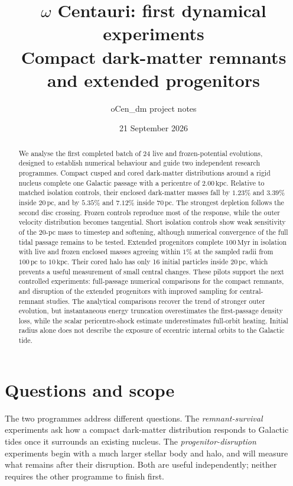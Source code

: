 \documentclass[11pt,a4paper]{article}
\title{\vspace{-1.0cm}$\omega$ Centauri: first dynamical experiments\\[3pt]
\large Compact dark-matter remnants and extended progenitors}
\author{oCen\_dm project notes}
\date{21 September 2026}
\newcommand{\pc}{\,\mathrm{pc}}
\newcommand{\kpc}{\,\mathrm{kpc}}
\newcommand{\Myr}{\,\mathrm{Myr}}
\begin{document}
\maketitle
\begin{abstract}
We analyse the first completed batch of 24 live and frozen-potential evolutions,
designed to establish numerical behaviour and guide two independent research
programmes. Compact cusped and cored dark-matter distributions around a rigid
nucleus complete one Galactic passage with a pericentre of $2.00\kpc$.
Relative to matched isolation controls, their enclosed dark-matter masses fall
by $1.23\%$ and $3.39\%$ inside $20\pc$, and by $5.35\%$ and $7.12\%$ inside
$70\pc$. The strongest depletion follows the second disc crossing. Frozen
controls reproduce most of the response, while the outer velocity distribution
becomes tangential. Short isolation controls show weak sensitivity of the
$20$-pc mass to timestep and softening, although numerical convergence of the
full tidal passage remains to be tested. Extended progenitors complete
$100\Myr$ in isolation with live and frozen enclosed masses agreeing within
$1\%$ at the sampled radii from $100\pc$ to $10\kpc$. Their cored halo has only
16 initial particles inside $20\pc$, which prevents a useful measurement of
small central changes. These pilots support the next controlled experiments:
full-passage numerical comparisons for the compact remnants, and disruption
of the extended progenitors with improved sampling for central-remnant studies.
The analytical comparisons recover the trend of stronger outer evolution,
but instantaneous energy truncation overestimates the first-passage density
loss, while the scalar pericentre-shock estimate underestimates full-orbit
heating. Initial radius alone does not describe the exposure of eccentric
internal orbits to the Galactic tide.
\end{abstract}

\section{Questions and scope}

The two programmes address different questions. The \emph{remnant-survival}
experiments ask how a compact dark-matter distribution responds to Galactic
tides once it surrounds an existing nucleus. The \emph{progenitor-disruption}
experiments begin with a much larger stellar body and halo, and will measure
what remains after their disruption. Both are useful independently; neither
requires the other programme to finish first.
\end{document}
